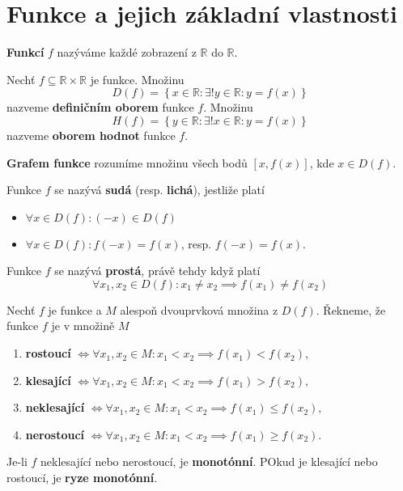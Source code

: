 \section{Funkce a jejich základní vlastnosti}
\begin{definition}
  \textbf{Funkcí} $f$ nazýváme každé zobrazení z $\mathbb R$ do $\mathbb R$.
\end{definition}

\begin{definition}
  Nechť $f\subseteq \mathbb R \times \mathbb R$ je funkce. Množinu
  \[
    D(f) = \left  \{ x \in \mathbb R:\exists ! y \in \mathbb R:y=f(x) \right \}
  \]
  nazveme \textbf{definičním oborem} funkce $f$. Množinu
  \[
    H(f) = \left  \{ y \in \mathbb R:\exists ! x \in \mathbb R:y=f(x) \right \}
  \]
  nazveme \textbf{oborem hodnot} funkce $f$.
\end{definition}

\begin{pozn}
  \textbf{Grafem funkce} rozumíme množinu všech bodů $[x,f(x)]$, kde $x\in D(f).$
\end{pozn}


\begin{definition}
  Funkce $f$ se nazývá \textbf{sudá} (resp. \textbf{lichá}), jestliže platí
\begin{itemize}
  \item
  $\forall x \in D(f):(-x) \in D(f)$
\item
 $\forall x \in D(f): f(-x)=f(x)$, resp. $f(-x)=f(x)$.
\end{itemize}

\end{definition}

\begin{definition}
  Funkce $f$ se nazývá \textbf{prostá}, právě tehdy když platí
  \[
    \forall x_1,x_2\in D(f): x_1\ne x_2 \implies f(x_1)\ne f(x_2)
  \]
\end{definition}

\begin{definition}
  Nechť $f$ je funkce a $M$ alespoň dvouprvková množina z $D(f)$. Řekneme, že funkce $f$ je v množině $M$
  \begin{enumerate}[$i.$]
    \item \textbf{rostoucí} $\iff \forall x_1, x_2 \in M: x_1 < x_2 \implies f(x_1) < f(x_2),$
    \item \textbf{klesající} $\iff \forall x_1, x_2 \in M: x_1 < x_2 \implies f(x_1) > f(x_2),$
    \item \textbf{neklesající} $\iff \forall x_1, x_2 \in M: x_1 < x_2 \implies f(x_1) \leq f(x_2),$
    \item \textbf{nerostoucí} $\iff \forall x_1, x_2 \in M: x_1 < x_2 \implies f(x_1) \geq f(x_2).$
  \end{enumerate}
  Je-li $f$ neklesající nebo nerostoucí, je \textbf{monotónní}. POkud je klesající nebo rostoucí, je \textbf{ryze monotónní}.
\end{definition}


